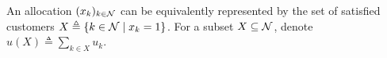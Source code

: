 

An allocation $(x_k)_{k \in {\cal N}}$ can be equivalently represented by the set of satisfied customers $X \triangleq \{k\in {\cal N}\mid  x_k=1\}$. For a subset $X \subseteq {\cal N}$, denote $u(X) \triangleq \sum_{k\in X}u_k$.









